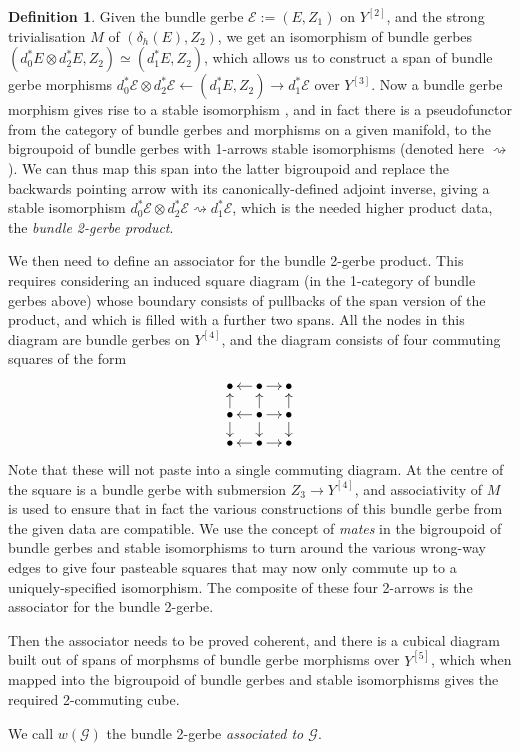 \documentclass[12pt]{amsart}
\theoremstyle{plain}
\theoremstyle{definition}
\newtheorem{definition}[theorem]{Definition}
\theoremstyle{remark}
\numberwithin{equation}{section}
\newcommand{\cG}{\mathcal{G}}
\newcommand{\cE}{{\mathcal E}}
\newcommand{\<}{\langle}
\renewcommand{\>}{\rangle}
\begin{document}
\begin{definition}\label{def:weakification_sketch}
Given the bundle gerbe $\cE := (E,Z_1)$ on $Y^{[2]}$, and the strong trivialisation $M$ of $(\delta_h(E),Z_2)$, we get an isomorphism of bundle gerbes $(d_0^*E\otimes d_2^*E,Z_2)\simeq (d_1^*E,Z_2)$, which allows us to construct a span of bundle gerbe morphisms $d_0^*\cE\otimes d_2^*\cE \leftarrow (d_1^*E,Z_2) \to d_1^*\cE$ over $Y^{[3]}$. 
Now a bundle gerbe morphism gives rise to a stable isomorphism \cite[Note 3.2.1]{StevPhD}, and in fact there is a pseudofunctor from the category of bundle gerbes and morphisms on a given manifold, to the bigroupoid of bundle gerbes with 1-arrows stable isomorphisms (denoted here $\rightsquigarrow$). 
We can thus map this span into the latter bigroupoid and replace the backwards pointing arrow with its canonically-defined adjoint inverse, giving a stable isomorphism $d_0^*\cE\otimes d_2^*\cE \rightsquigarrow d_1^*\cE$, which is the needed higher product data, the \emph{bundle 2-gerbe product}.

We then need to define an associator for the bundle 2-gerbe product. This requires considering an induced square diagram (in the 1-category of bundle gerbes above) whose boundary consists of pullbacks of the span version of the product, and which is filled with a further two spans. 
All the nodes in this diagram are bundle gerbes on $Y^{[4]}$, and the diagram consists of four commuting squares of the form
\[
  \xymatrix@=1em{
    \bullet & \ar[l] \bullet \ar[r] & \bullet\\
    \ar[u] \bullet \ar[d] & \ar[l] \ar[u] \bullet \ar[r] \ar[d] & \ar[u] \bullet \ar[d] \\
    \bullet & \ar[l] \bullet \ar[r] & \bullet
  }
\] 
Note that these will not paste into a single commuting diagram. 
At the centre of the square is a bundle gerbe with submersion $Z_3\to Y^{[4]}$, and associativity of $M$ is used to ensure that in fact the various constructions of this bundle gerbe from the given data are compatible. 
We use the concept of \emph{mates} in the bigroupoid of bundle gerbes and stable isomorphisms to turn around the various wrong-way edges to give four pasteable squares that may now only commute up to a uniquely-specified isomorphism. 
The composite of these four 2-arrows is the associator for the bundle 2-gerbe.

Then the associator needs to be proved coherent, and there is a cubical diagram built out of spans of morphsms of bundle gerbe morphisms over $Y^{[5]}$, which when mapped into the bigroupoid of bundle gerbes and stable isomorphisms gives the required 2-commuting cube.
 
We call $w(\cG)$ the bundle 2-gerbe \emph{associated to $\cG$}.
\end{definition}
\end{document}

